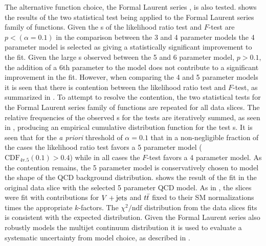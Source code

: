 The alternative function choice, the Formal Laurent series , is also tested.
 shows the results of the two statistical test being applied to the Formal Laurent series family of functions.
Given the \pvalue{}s of the likelihood ratio test and $F$-test are $p < \left(\alpha=0.1\right)$ in the comparison between the 3 and 4 parameter models the 4 parameter model is selected as giving a statistically significant improvement to the fit.
Given the large \pvalue{}s observed between the 5 and 6 parameter model, $p > 0.1$, the addition of a 6th parameter to the model does not contribute to a significant improvement in the fit.
However, when comparing the 4 and 5 parameter models it is seen that there is contention between the likelihood ratio test and $F$-test, as summarized in .
To attempt to resolve the contention, the two statistical tests for the Formal Laurent series family of functions are repeated for all \CRQCD{} data slices.
The relative frequencies of the observed \pvalue{}s for the tests are iteratively summed, as seen in , producing an empirical cumulative distribution function for the test \pvalue{}s.
It is seen that for the \emph{a priori} threshold of $\alpha=0.1$ that in a non-negligible fraction of the cases the likelihood ratio test favors a 5 parameter model ($\textrm{CDF}_{4\textrm{v.}5}\left(0.1\right) > 0.4$) while in all cases the $F$-test favors a 4 parameter model.
As the contention remains, the 5 parameter model is conservatively chosen to model the shape of the QCD background distribution.
 shows the result of the fit in the original data slice with the selected 5 parameter QCD model.
As in , the \CRQCD{} slices were fit with contributions for $V + \text{jets}$ and $t\bar{t}$ fixed to their SM normalizations times the appropriate $k$-factors.
The $\chi^2/\mathrm{ndf}$ distribution from the data slices fits is consistent with the expected distribution.
Given the Formal Laurent series also robustly models the multijet continuum distribution it is used to evaluate a systematic uncertainty from model choice, as described in .

